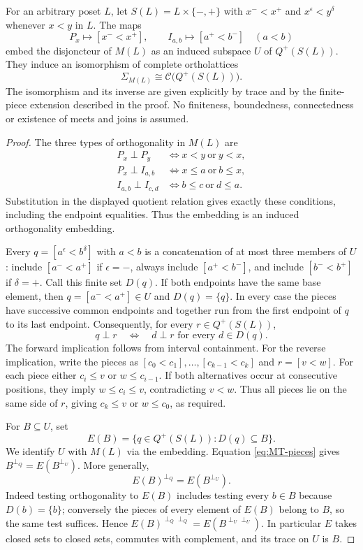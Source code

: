 \begin{theorem}
\label{SA21-MT01}
For an arbitrary poset $L$, let $S(L)=L\times\{-,+\}$ with
$x^-<x^+$ and $x^\epsilon<y^\delta$ whenever $x<y$ in $L$.
The maps
\[
 P_x\longmapsto[x^-<x^+],\qquad
 I_{a,b}\longmapsto[a^+<b^-]\quad(a<b)
\]
embed the disjoncteur of $M(L)$ as an induced subspace $U$ of
$Q^+(S(L))$. They induce an isomorphism of complete ortholattices
\[
 \Sigma_{M(L)}\cong\mathcal C\bigl(Q^+(S(L))\bigr).
\]
The isomorphism and its inverse are given explicitly by trace and by
the finite-piece extension described in the proof. No finiteness,
boundedness, connectedness or existence of meets and joins is assumed.
\end{theorem}
\begin{proof}
The three types of orthogonality in $M(L)$ are
\begin{align*}
 P_x\perp P_y&\iff x<y\ \text{or}\ y<x,\\
 P_x\perp I_{a,b}&\iff x\le a\ \text{or}\ b\le x,\\
 I_{a,b}\perp I_{c,d}&\iff b\le c\ \text{or}\ d\le a.
\end{align*}
Substitution in the displayed quotient relation gives exactly these
conditions, including the endpoint equalities. Thus the embedding is
an induced orthogonality embedding.

Every $q=[a^\epsilon<b^\delta]$ with $a<b$ is a concatenation of
at most three members of $U$: include $[a^-<a^+]$ if $\epsilon=-$,
always include $[a^+<b^-]$, and include $[b^-<b^+]$ if $\delta=+$.
Call this finite set $D(q)$. If both endpoints have the same base
element, then $q=[a^-<a^+]\in U$ and $D(q)=\{q\}$.
In every case the pieces have successive common endpoints and together
run from the first endpoint of $q$ to its last endpoint. Consequently,
for every $r\in Q^+(S(L))$,
\begin{equation}
 \label{eq:MT-pieces}
 q\perp r\quad\Longleftrightarrow\quad
 d\perp r\text{ for every }d\in D(q).
\end{equation}
The forward implication follows from interval containment. For the
reverse implication, write the pieces as
$[c_0<c_1],\ldots,[c_{k-1}<c_k]$ and $r=[v<w]$.
For each piece either $c_i\le v$ or $w\le c_{i-1}$.
If both alternatives occur at consecutive positions, they imply
$w\le c_i\le v$, contradicting $v<w$. Thus all pieces lie on the
same side of $r$, giving $c_k\le v$ or $w\le c_0$, as required.

For $B\subseteq U$, set
\[
 E(B)=\{q\in Q^+(S(L)):D(q)\subseteq B\}.
\]
We identify $U$ with $M(L)$ via the embedding. Equation
\eqref{eq:MT-pieces} gives
$B^{\perp_{Q}}=E(B^{\perp_U})$.
More generally,
\[
 E(B)^{\perp_Q}=E(B^{\perp_U}).
\]
Indeed testing orthogonality to $E(B)$ includes testing every $b\in B$
because $D(b)=\{b\}$; conversely the pieces of every element of
$E(B)$ belong to $B$, so the same test suffices. Hence
$E(B)^{\perp_Q\perp_Q}=E(B^{\perp_U\perp_U})$.
In particular $E$ takes closed sets to closed sets, commutes with
complement, and its trace on $U$ is $B$.


\end{proof}
